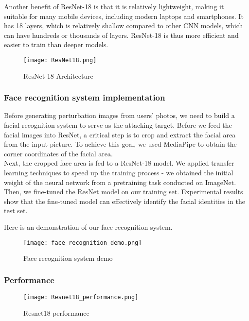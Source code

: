 Another benefit of ResNet-18 is that it is relatively lightweight, making it suitable for many mobile devices, including modern laptops and smartphones. It has 18 layers, which is relatively shallow compared to other CNN models, which can have hundreds or thousands of layers. ResNet-18 is thus more efficient and easier to train than deeper models.

\begin{figure}[h]
\centering
\texttt{[image: ResNet18.png]}
\caption{ResNet-18 Architecture}
\label{fig:resnet18}
\end{figure}

\subsubsection{Face recognition system implementation}

Before generating perturbation images from users’ photos, we need to build a facial recognition system to serve as the attacking target. Before we feed the facial images into ResNet, a critical step is to crop and extract the facial area from the input picture. To achieve this goal, we used MediaPipe to obtain the corner coordinates of the facial area.\\

Next, the cropped face area is fed to a ResNet-18 model. We applied transfer learning techniques to speed up the training process - we obtained the initial weight of the neural network from a pretraining task conducted on ImageNet. Then, we fine-tuned the ResNet model on our training set. Experimental results show that the fine-tuned model can effectively identify the facial identities in the test set. 


Here is an demonstration of our face recognition system.

\begin{figure}[h]
    \centering
    \texttt{[image: face\_recognition\_demo.png]}
    \caption{Face recognition system demo}
    \label{fig:face-recognition-demo}
    \end{figure}

\subsubsection{Performance}

\begin{figure}[h]
    \centering
    \texttt{[image: Resnet18\_performance.png]}
    \caption{Resnet18 performance}
    \label{fig:resnet18_performance}
\end{figure}

